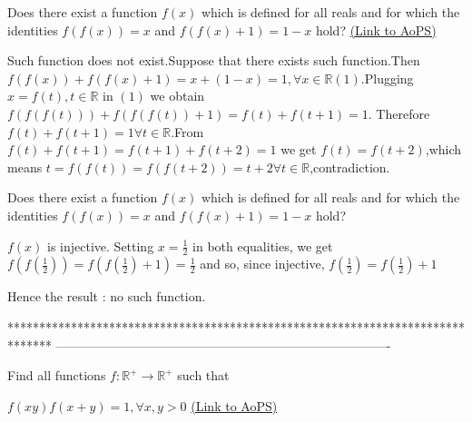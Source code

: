 \begin{problem}
	Does there exist a function $f(x)$ which is defined for all reals and for which the identities $f(f(x))=x$ and $f(f(x)+1)=1-x$ hold?
	\flushright \href{https://artofproblemsolving.com/community/c6h618394}{(Link to AoPS)}
\end{problem}



\begin{solution}
	Such function does not exist.Suppose that there exists such function.Then $f(f(x))+f(f(x)+1)=x+(1-x)=1,\forall x\in\mathbb{R}(1)$.Plugging $x=f(t),t\in\mathbb{R}$ in $(1)$ we obtain $f(f(f(t)))+f(f(f(t))+1)=f(t)+f(t+1)=1$.
Therefore $f(t)+f(t+1)=1 \forall t\in\mathbb{R}$.From $f(t)+f(t+1)=f(t+1)+f(t+2)=1$ we get $f(t)=f(t+2)$,which means $t=f(f(t))=f(f(t+2))=t+2 \forall t\in\mathbb{R}$,contradiction.
\end{solution}



\begin{solution}
	\begin{tcolorbox}Does there exist a function $f(x)$ which is defined for all reals and for which the identities $f(f(x))=x$ and $f(f(x)+1)=1-x$ hold?\end{tcolorbox}
$f(x)$ is injective.
Setting $x=\frac 12$ in both equalities, we get $f(f(\frac 12))=f(f(\frac 12)+1)=\frac 12$ and so, since injective, $f(\frac 12)=f(\frac 12)+1$

Hence the result : no such function.
\end{solution}
*******************************************************************************
-------------------------------------------------------------------------------

\begin{problem}
	Find all functions $f:\mathbb{R}^{+}\rightarrow \mathbb{R}^{+}  $ such that

$f(xy)f(x+y)=1, \forall x,y> 0$
	\flushright \href{https://artofproblemsolving.com/community/c6h618467}{(Link to AoPS)}
\end{problem}



